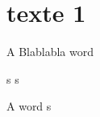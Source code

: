 \documentclass{scrbook}
\begin{document}
\section{texte 1}
\beginnumbering
\pstart
A  Blablabla  word
\pend
\endnumbering

s
s

\beginnumbering
\pstart
A  word
\pend
\endnumbering
s
\end{document}
